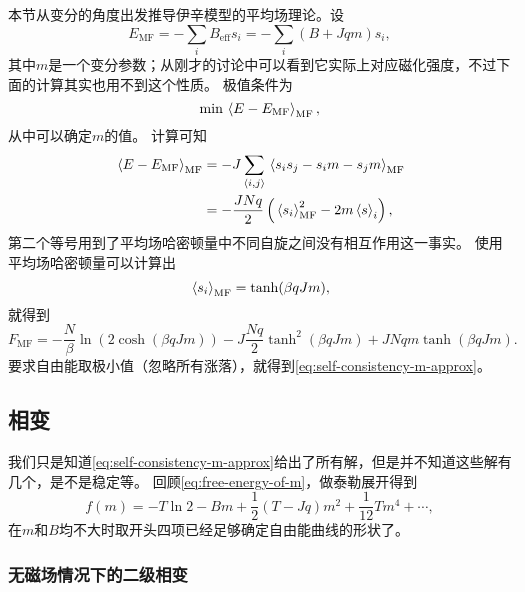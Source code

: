 \documentclass[hyperref, UTF8, a4paper]{ctexart}
\newcommand*{\pair}[1]{\langle #1 \rangle}
\begin{document}
本节从变分的角度出发推导伊辛模型的平均场理论。设
\[
    E_\text{MF} = - \sum_i B_\text{eff} s_i = - \sum_i (B + J q m) s_i,
\]
其中$m$是一个变分参数；从刚才的讨论中可以看到它实际上对应磁化强度，不过下面的计算其实也用不到这个性质。
极值条件为
\[
    \min \expval*{E - E_\text{MF}}_\text{MF},
\]
从中可以确定$m$的值。
计算可知
\[
    \begin{aligned}
        \expval*{E - E_\text{MF}}_\text{MF} &= - J \sum_{\pair{i,j}} \expval*{s_i s_j - s_i m - s_j m}_\text{MF} \\
        &= - \frac{J N q}{2} \left( \expval*{s_i}^2_\text{MF} - 2 m \expval*{s}_i \right),
    \end{aligned}
\]
第二个等号用到了平均场哈密顿量中不同自旋之间没有相互作用这一事实。
使用平均场哈密顿量可以计算出
\[
    \expval*{s_i}_\text{MF} = \tanh(\beta q J m),
\]
就得到
\begin{equation}
    F_\text{MF} = - \frac{N}{\beta} \ln(2\cosh(\beta q J m)) - J \frac{N q}{2} \tanh^2(\beta q J m) + J N q m \tanh(\beta q J m).
\end{equation}
要求自由能取极小值（忽略所有涨落），就得到\eqref{eq:self-consistency-m-approx}。

\subsection{相变}

我们只是知道\eqref{eq:self-consistency-m-approx}给出了所有解，但是并不知道这些解有几个，是不是稳定等。
回顾\eqref{eq:free-energy-of-m}，做泰勒展开得到
\begin{equation}
    f(m) = - T \ln 2 - Bm + \frac{1}{2} (T-Jq) m^2 + \frac{1}{12} T m^4 + \cdots,
    \label{eq:mf-free-energy-series-m}
\end{equation}
在$m$和$B$均不大时取开头四项已经足够确定自由能曲线的形状了。

\subsubsection{无磁场情况下的二级相变}
\end{document}
